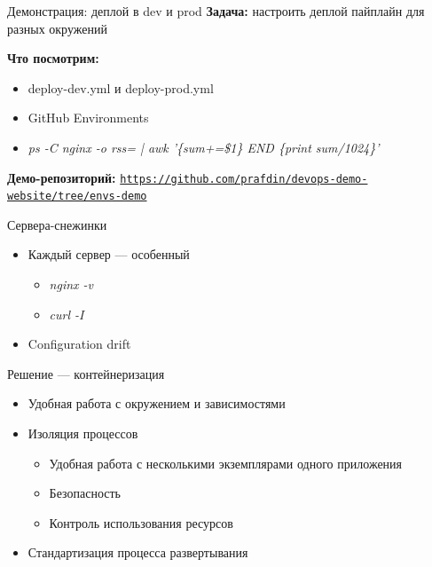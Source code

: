 \documentclass[aspectratio=169]{beamer}
\begin{document}
    \begin{frame}{Демонстрация: деплой в dev и prod}
        \textbf{Задача:} настроить деплой пайплайн для разных окружений

        \vspace{0.3cm}

        \textbf{Что посмотрим:}
        \begin{itemize}
            \item deploy-dev.yml и deploy-prod.yml
            \item GitHub Environments
            \item \textit{ps -C nginx -o rss= | awk '\{sum+=\$1\} END \{print sum/1024\}'}
        \end{itemize}

        \vspace{0.2cm}
        \textbf{Демо-репозиторий:}
        \href{https://github.com/prafdin/devops-demo-website/tree/envs-demo}{\texttt{https://github.com/prafdin/devops-demo-website/tree/envs-demo}}
    \end{frame}

    \begin{frame}{Сервера-снежинки}
        \begin{itemize}
            \item Каждый сервер — особенный
            \begin{itemize}
                \item \textit{nginx -v}
                \item \textit{curl -I}
            \end{itemize}
            \item Configuration drift
        \end{itemize}
    \end{frame}

    \begin{frame}{Решение — контейнеризация}
        \begin{itemize}
            \item Удобная работа с окружением и зависимостями
            \item Изоляция процессов
            \begin{itemize}
                \item Удобная работа с несколькими экземплярами одного приложения
                \item Безопасность
                \item Контроль использования ресурсов
            \end{itemize}
            \item Стандартизация процесса развертывания
        \end{itemize}
    \end{frame}
\end{document}
